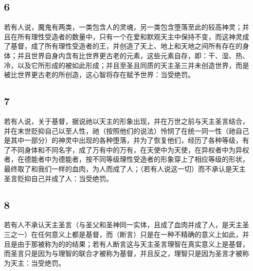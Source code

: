 
\subsection{6}

若有人说，魔鬼有两类，一类包含人的灵魂，另一类包含堕落至此的较高神灵；并且在所有理性受造者的数量中，只有一个在爱和默观天主中保持不变，而这神灵成了基督，成了所有理性受造者的王，并创造了天上、地上和天地之间所有存在的身体；并且世界自身内含有比世界更古老的元素，这些元素自存，即：干、湿、热、冷，以及它所形成的被如此形成；并且至圣且同质的天主圣三并未创造世界，而是被比世界更古老的所创造，这心智将存在赋予世界：当受绝罚。\par


\subsection{7}

若有人说，关于基督，据说祂以天主的形象出现，并在万世之前与天主圣言结合，并在末世贬抑自己以至人性，祂（按照他们的说法）怜悯了在统一同一性（祂自己是其中一部分）的神灵中出现的各种堕落，并为了恢复他们，经历了各种等级，有了不同身体和不同名字，成了万有中的万有，在天使中为天使，在异权者中为异权者，在德能者中为德能者，按不同等级理性受造者的形象穿上了相应等级的形状，最终取了和我们一样的血肉，为人而成了人；（若有人说这一切）而不承认是天主圣言贬抑自己并成了人：当受绝罚。\par


\subsection{8}

若有人不承认天主圣言（与圣父和圣神同一实体，且成了血肉并成了人，是天主圣三之一）在任何意义上都是基督，而（断言）只是在一种不精确的意义上如此，并且是由于那被称为的的结果；若有人断言这与天主圣言理智在真实意义上是基督，而圣言只是因为与理智的联合才被称为基督，并且反之，理智只是因为圣言才被称为天主：当受绝罚。\par


